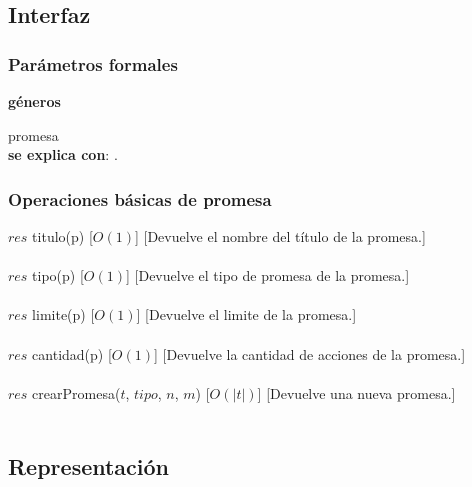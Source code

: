 \subsection{Interfaz}

  \subsubsection{Par\'ametros formales}
   \parbox{1.7cm}{\textbf{g\'eneros}} promesa\\
   
  \textbf{se explica con}: .


  \subsubsection{Operaciones b\'asicas de promesa}

  {$res$ \igobs titulo(p)}
  [$O(1)$]
  [Devuelve el nombre del t\'itulo de la promesa.]\\\\

  {$res$ \igobs tipo(p)}
  [$O(1)$]
  [Devuelve el tipo de promesa de la promesa.]\\\\

  {$res$ \igobs limite(p)}
  [$O(1)$]
  [Devuelve el limite de la promesa.]\\\\

  {$res$ \igobs cantidad(p)}
  [$O(1)$]
  [Devuelve la cantidad de acciones de la promesa.]\\\\

  {$res$ \igobs crearPromesa($t$, $tipo$, $n$, $m$)}
  [$O(|t|)$]
  [Devuelve una nueva promesa.]\\\\



\subsection{Representaci\'on}

